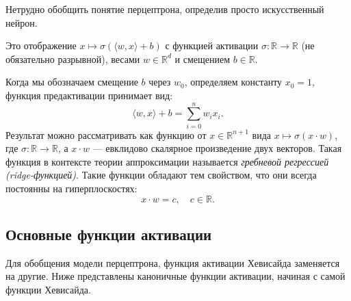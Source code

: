 \documentclass[../NDCNNAI_main.tex]{subfiles}
\begin{document}
	Нетрудно обобщить понятие перцептрона, определив просто искусственный нейрон.
	\begin{definition}
		Это отображение $x \mapsto \sigma(\langle w, x \rangle + b)$ с функцией активации $\sigma\colon \mathbb{R} \rightarrow \mathbb{R}$ (не обязательно разрывной), весами $w \in \mathbb{R}^d$ и смещением $b \in \mathbb{R}.$ 
	\end{definition}
	
	\begin{definition}	
	Когда мы обозначаем смещение $b$ через $w_0$, определяем константу $x_0 = 1$, функция предактивации принимает вид:
	$$\langle w, x \rangle + b =  \sum_{i=0}^{n}w_ix_i.$$
	Результат можно рассматривать как функцию от $x \in \mathbb{R}^{n+1}$ вида $ x \mapsto \sigma(x \cdot w)$,	где $\sigma\colon \mathbb{R} \rightarrow \mathbb{R}$, а $x \cdot w$ --- евклидово скалярное произведение двух векторов.
	Такая функция в контексте теории аппроксимации называется \emph{гребневой регрессией (ridge-функцией)}.
	Такие функции обладают тем свойством, что они всегда постоянны на гиперплоскостях:
	$$ x \cdot w = c, \quad c \in \mathbb{R}.	$$	
\end{definition}
	
\subsection{Основные функции активации}
Для обобщения модели перцептрона, функция активации Хевисайда заменяется на другие.
Ниже представлены каноничные функции активации, начиная с самой функции Хевисайда. 
\end{document}
